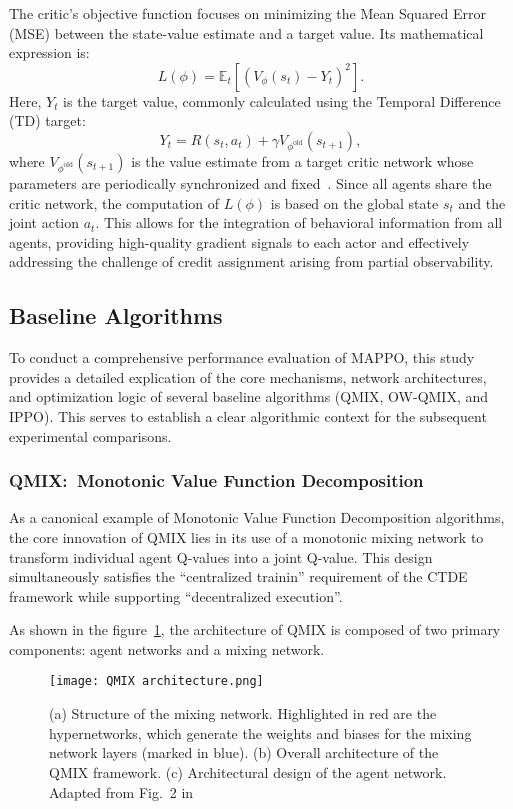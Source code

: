 The critic's objective function focuses on minimizing the Mean Squared Error (MSE) between the state-value estimate and a target value. Its mathematical expression is:
\begin{equation}
    L\left( {\phi} \right) = \mathbb{E}_t\left[ \left( V_{\phi}\left( s_t \right) - Y_t \right)^2 \right].
\end{equation}
Here, $Y_t$ is the target value, commonly calculated using the Temporal Difference (TD) target:
\begin{equation}
    Y_t = R(s_t, a_t) + \gamma V_{\phi^{\text{old}}}(s_{t+1}),
\end{equation}
where $V_{\phi^{\text{old}}}(s_{t+1})$ is the value estimate from a target critic network whose parameters are periodically synchronized and fixed~\cite{yuSurprisingEffectivenessPPO2022}. Since all agents share the critic network, the computation of $L(\phi)$ is based on the global state $s_t$ and the joint action $a_t$. This allows for the integration of behavioral information from all agents, providing high-quality gradient signals to each actor and effectively addressing the challenge of credit assignment arising from partial observability.

\subsection{Baseline Algorithms}

To conduct a comprehensive performance evaluation of MAPPO, this study provides a detailed explication of the core mechanisms, network architectures, and optimization logic of several baseline algorithms (QMIX, OW-QMIX, and IPPO). This serves to establish a clear algorithmic context for the subsequent experimental comparisons.

\subsubsection{QMIX:~Monotonic Value Function Decomposition}

As a canonical example of Monotonic Value Function Decomposition algorithms, the core innovation of QMIX lies in its use of a monotonic mixing network to transform individual agent Q-values into a joint Q-value. This design simultaneously satisfies the ``centralized trainin'' requirement of the CTDE framework while supporting ``decentralized execution''.

As shown in the figure~\ref{fig:QMIX architecture}, the architecture of QMIX is composed of two primary components: agent networks and a mixing network.
\begin{figure*}[htbp]
    \centering %
    \texttt{[image: QMIX architecture.png]}
    \caption{
        (a) Structure of the mixing network. Highlighted in red are the hypernetworks, which generate the weights and biases for the mixing network layers (marked in blue). 
        (b) Overall architecture of the QMIX framework. 
        (c) Architectural design of the agent network. 
        Adapted from Fig.~2 in~\cite{rashidQMIXMonotonicValue2018}
    }\label{fig:QMIX architecture}
\end{figure*}

